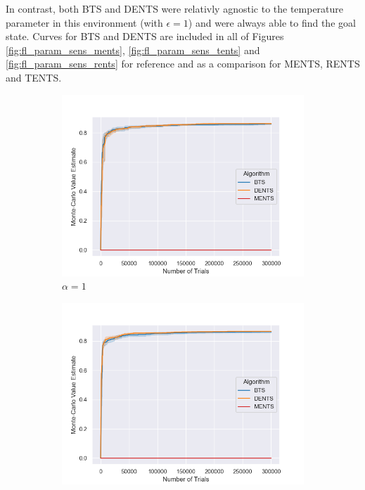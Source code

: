             In contrast, both BTS and DENTS were relativly agnostic to the temperature parameter in this environment (with $\epsilon=1$) and were always able to find the goal state. Curves for BTS and DENTS are included in all of Figures \ref{fig:fl_param_sens_ments}, \ref{fig:fl_param_sens_tents} and \ref{fig:fl_param_sens_rents} for reference and as a comparison for MENTS, RENTS and TENTS.
        
            
            \begin{figure}
                \centering
                
                \begin{subfigure}[b]{0.32\textwidth}
                    \centering
                    \includegraphics[width=\textwidth]{figures/temp/fl_sens/053_fl8_1_0_01.png}
                    \caption{$\alpha=1$}
                \end{subfigure}
                \begin{subfigure}[b]{0.32\textwidth}
                    \centering
                    \includegraphics[width=\textwidth]{figures/temp/fl_sens/054_fl8_0_5_01.png}

\end{subfigure}
\end{figure}
